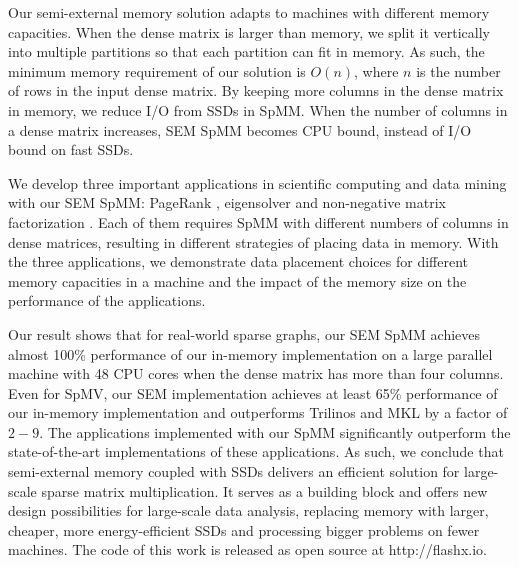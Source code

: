 Our semi-external memory solution adapts to machines with different memory
capacities. When the dense matrix is larger than memory, we split it
vertically into multiple partitions so that each partition can fit in
memory. As such, the minimum memory requirement of our solution is $O(n)$,
where $n$ is the number of rows in the input dense matrix. By keeping more columns
in the dense matrix in memory, we reduce I/O from SSDs in SpMM. When the number
of columns in a dense matrix increases, SEM SpMM becomes CPU bound, instead of
I/O bound on fast SSDs.

We develop three important applications in scientific computing and data mining
with our SEM SpMM: PageRank \cite{pagerank}, eigensolver \cite{anasazi} and
non-negative matrix factorization \cite{nmf}. Each of them requires SpMM with
different numbers of columns in dense matrices, resulting in different
strategies of placing data in memory. With the three applications, we
demonstrate data placement choices for different memory capacities in a machine
and the impact of the memory size on the performance of the applications.


Our result shows that for real-world sparse graphs, our SEM SpMM achieves almost
100\% performance of our in-memory implementation on a large parallel machine
with 48 CPU cores when the dense matrix has more than four columns. Even for
SpMV, our SEM implementation achieves at least 65\% performance of our in-memory
implementation and outperforms Trilinos \cite{trilinos} and MKL \cite{mkl} by
a factor of $2-9$. The applications implemented with our SpMM significantly
outperform the state-of-the-art implementations of these applications. As such,
we conclude that semi-external memory coupled with SSDs delivers an efficient
solution for large-scale sparse matrix multiplication. It serves
as a building block and offers new design possibilities for large-scale
data analysis, replacing memory with larger, cheaper, more energy-efficient SSDs
and processing bigger problems on fewer machines. The code of this work is
released as open source at http://flashx.io.
